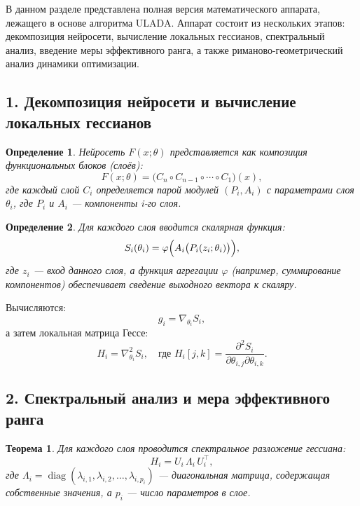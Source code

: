 \documentclass[a4paper,12pt]{article}
\newtheorem{theorem}{Теорема}
\newtheorem{definition}{Определение}
\begin{document}
В данном разделе представлена полная версия математического аппарата, лежащего в основе алгоритма ULADA. Аппарат состоит из нескольких этапов: декомпозиция нейросети, вычисление локальных гессианов, спектральный анализ, введение меры эффективного ранга, а также риманово-геометрический анализ динамики оптимизации.

\subsection*{1. Декомпозиция нейросети и вычисление локальных гессианов}

\begin{definition}
Нейросеть \( F(x;\theta) \) представляется как композиция функциональных блоков (слоёв):
\begin{equation}
F(x;\theta) = \big( C_n \circ C_{n-1} \circ \cdots \circ C_1 \big)(x),
\end{equation}
где каждый слой \( C_i \) определяется парой модулей \((P_i, A_i)\) с параметрами слоя \(\theta_i\), где \(P_i\) и \(A_i\) --- компоненты i-го слоя.
\end{definition}

\begin{definition}
Для каждого слоя вводится скалярная функция:
\begin{equation}
S_i(\theta_i) = \varphi\Bigl(A_i\bigl(P_i(z_i;\theta_i)\bigr)\Bigr),
\end{equation}
где \( z_i \) --- вход данного слоя, а функция агрегации \(\varphi\) (например, суммирование компонентов) обеспечивает сведение выходного вектора к скаляру.
\end{definition}

Вычисляются:
\begin{equation}
g_i = \nabla_{\theta_i} S_i,
\end{equation}
а затем локальная матрица Гессе:
\begin{equation}
H_i = \nabla^2_{\theta_i} S_i, \quad \text{где } H_i[j,k] = \frac{\partial^2 S_i}{\partial \theta_{i,j}\partial \theta_{i,k}}.
\end{equation}

\subsection*{2. Спектральный анализ и мера эффективного ранга}

\begin{theorem}
Для каждого слоя проводится спектральное разложение гессиана:
\begin{equation}
H_i = U_i\,\Lambda_i\,U_i^\top,
\end{equation}
где \(\Lambda_i = \operatorname{diag}(\lambda_{i,1}, \lambda_{i,2}, \dots, \lambda_{i,p_i})\) --- диагональная матрица, содержащая собственные значения, а \(p_i\) --- число параметров в слое.
\end{theorem}
\end{document}
